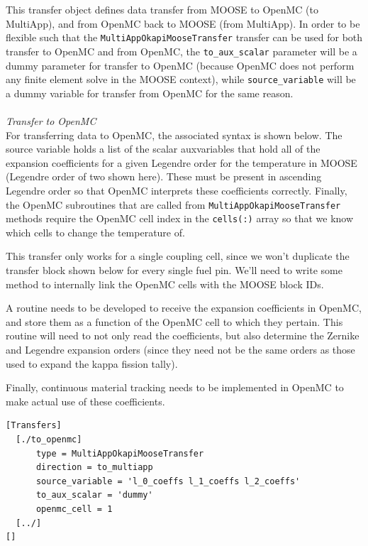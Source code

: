 \documentclass[10pt]{article}
\newcounter{subsubsubsection}[subsubsection]
\numberwithin{equation}{section} %
\begin{document}
This transfer object defines data transfer from MOOSE to OpenMC (to MultiApp), and from OpenMC back to MOOSE (from MultiApp). In order to be flexible such that the {\tt MultiAppOkapiMooseTransfer} transfer can be used for both transfer to OpenMC and from OpenMC, the {\tt to\_aux\_scalar} parameter will be a dummy parameter for transfer to OpenMC (because OpenMC does not perform any finite element solve in the MOOSE context), while {\tt source\_variable} will be a dummy variable for transfer from OpenMC for the same reason.
\\\\
{\it Transfer to OpenMC}\\
For transferring data to OpenMC, the associated syntax is shown below. The source variable holds a list of the scalar auxvariables that hold all of the expansion coefficients for a given Legendre order for the temperature in MOOSE (Legendre order of two shown here). These must be present in ascending Legendre order so that OpenMC interprets these coefficients correctly.  Finally, the OpenMC subroutines that are called from {\tt MultiAppOkapiMooseTransfer} methods require the OpenMC cell index in the {\tt cells(:)} array so that we know which cells to change the temperature of. 

\color{magenta}
This transfer only works for a single coupling cell, since we won't duplicate the transfer block shown below for every single fuel pin. We'll need to write some method to internally link the OpenMC cells with the MOOSE block IDs. 

A routine needs to be developed to receive the expansion coefficients in OpenMC, and store them as a function of the OpenMC cell to which they pertain. This routine will need to not only read the coefficients, but also determine the Zernike and Legendre expansion orders (since they need not be the same orders as those used to expand the kappa fission tally).

Finally, continuous material tracking needs to be implemented in OpenMC to make actual use of these coefficients.
\color{black}

\begin{lstlisting}
[Transfers]
  [./to_openmc]
      type = MultiAppOkapiMooseTransfer
      direction = to_multiapp
      source_variable = 'l_0_coeffs l_1_coeffs l_2_coeffs'
      to_aux_scalar = 'dummy'
      openmc_cell = 1
  [../]
[]
\end{lstlisting}
\end{document}
